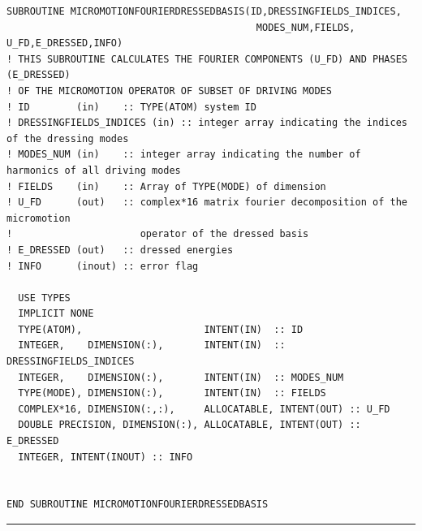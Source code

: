 \documentclass[10pt,a4paper]{article}
\begin{document}
\begin{verbatim}
SUBROUTINE MICROMOTIONFOURIERDRESSEDBASIS(ID,DRESSINGFIELDS_INDICES,
                                           MODES_NUM,FIELDS, U_FD,E_DRESSED,INFO)
! THIS SUBROUTINE CALCULATES THE FOURIER COMPONENTS (U_FD) AND PHASES (E_DRESSED) 
! OF THE MICROMOTION OPERATOR OF SUBSET OF DRIVING MODES
! ID        (in)    :: TYPE(ATOM) system ID
! DRESSINGFIELDS_INDICES (in) :: integer array indicating the indices of the dressing modes
! MODES_NUM (in)    :: integer array indicating the number of harmonics of all driving modes 
! FIELDS    (in)    :: Array of TYPE(MODE) of dimension 
! U_FD      (out)   :: complex*16 matrix fourier decomposition of the micromotion 
!                      operator of the dressed basis
! E_DRESSED (out)   :: dressed energies
! INFO      (inout) :: error flag
 
  USE TYPES
  IMPLICIT NONE
  TYPE(ATOM),                     INTENT(IN)  :: ID
  INTEGER,    DIMENSION(:),       INTENT(IN)  :: DRESSINGFIELDS_INDICES
  INTEGER,    DIMENSION(:),       INTENT(IN)  :: MODES_NUM
  TYPE(MODE), DIMENSION(:),       INTENT(IN)  :: FIELDS
  COMPLEX*16, DIMENSION(:,:),     ALLOCATABLE, INTENT(OUT) :: U_FD
  DOUBLE PRECISION, DIMENSION(:), ALLOCATABLE, INTENT(OUT) :: E_DRESSED
  INTEGER, INTENT(INOUT) :: INFO


END SUBROUTINE MICROMOTIONFOURIERDRESSEDBASIS
\end{verbatim}
\begin{center}
\rule{12cm}{1pt}
\end{center}
\end{document}
